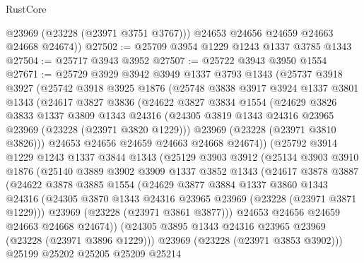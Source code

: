 \begin{lexlean}{RustCore}
\begin{coremodule}
          @23969
          (@23228 (@23971 @3751 @3767)))
        @24653
        @24656
        @24659
        @24663
        @24668
        @24674))
@27502 := @25709 @3954 @1229 @1243 @1337 @3785 @1343
@27504 := @25717 @3943 @3952
@27507 := @25722 @3943 @3950 @1554
@27671 := @25729
    @3929
    @3942
    @3949
    @1337
    @3793
    @1343
    (@25737
      @3918
      @3927
      (@25742
        @3918
        @3925
        @1876
        (@25748
          @3838
          @3917
          @3924
          @1337
          @3801
          @1343
          (@24617
            @3827
            @3836
            (@24622
              @3827
              @3834
              @1554
              (@24629
                @3826
                @3833
                @1337
                @3809
                @1343
                @24316
                (@24305 @3819 @1343 @24316 @23965 @23969 (@23228 (@23971 @3820 @1229)))
                @23969
                (@23228 (@23971 @3810 @3826)))
              @24653
              @24656
              @24659
              @24663
              @24668
              @24674))
          (@25792
            @3914
            @1229
            @1243
            @1337
            @3844
            @1343
            (@25129
              @3903
              @3912
              (@25134
                @3903
                @3910
                @1876
                (@25140
                  @3889
                  @3902
                  @3909
                  @1337
                  @3852
                  @1343
                  (@24617
                    @3878
                    @3887
                    (@24622
                      @3878
                      @3885
                      @1554
                      (@24629
                        @3877
                        @3884
                        @1337
                        @3860
                        @1343
                        @24316
                        (@24305 @3870 @1343 @24316 @23965 @23969 (@23228 (@23971 @3871 @1229)))
                        @23969
                        (@23228 (@23971 @3861 @3877)))
                      @24653
                      @24656
                      @24659
                      @24663
                      @24668
                      @24674))
                  (@24305 @3895 @1343 @24316 @23965 @23969 (@23228 (@23971 @3896 @1229)))
                  @23969
                  (@23228 (@23971 @3853 @3902)))
                @25199
                @25202
                @25205
                @25209
                @25214

\end{coremodule}
\end{lexlean}
